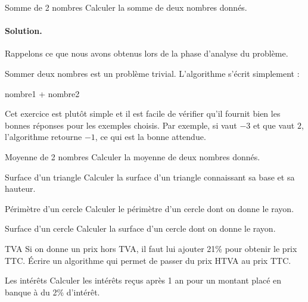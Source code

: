 			\begin{Exercice}{Somme de 2 nombres}
				Calculer la somme de deux nombres donnés.
				\paragraph{Solution.}
				Rappelons ce que nous avons obtenus 
				lors de la phase d'analyse du problème.
				\begin{center}
				\end{center}
				Sommer deux nombres est un problème trivial.
				L'algorithme s'écrit simplement :			
				\begin{LDA}
						\Return nombre1 + nombre2
					\EndAlgo
				\end{LDA}
				Cet exercice est plutôt simple 
				et il est facile de vérifier qu'il fournit
				bien les bonnes réponses pour les exemples choisis.
				Par exemple, si  vaut $-3$
				et que  vaut $2$,
				l'algorithme retourne $-1$, 
				ce qui est la bonne attendue.
			\end{Exercice}
		
			\begin{Exercice}{Moyenne de 2 nombres}
				Calculer la moyenne de deux nombres donnés.
			\end{Exercice}
			
			\begin{Exercice}{Surface d’un triangle}
				Calculer la surface d’un triangle 
				connaissant sa base et sa hauteur.
			\end{Exercice}
		
			\begin{Exercice}{Périmètre d’un cercle}
				Calculer le périmètre d’un cercle dont on donne le rayon. 
			\end{Exercice}
		
			\begin{Exercice}{Surface d’un cercle}
				Calculer la surface d’un cercle dont on donne le rayon. 
			\end{Exercice}
		
			\begin{Exercice}{TVA}
				Si on donne un prix hors TVA, il faut lui ajouter 21\% 
				pour obtenir le prix TTC. Écrire un algorithme qui permet 
				de passer du prix HTVA au prix TTC.
			\end{Exercice}
		
			\begin{Exercice}{Les intérêts}
				Calculer les intérêts reçus après 1 an 
				pour un montant placé en banque à du 2\% d’intérêt.
			\end{Exercice}
		
